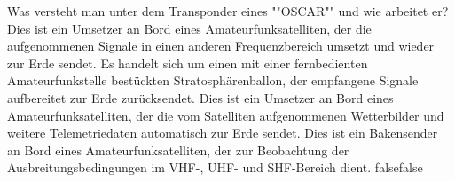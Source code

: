     {Was versteht man unter dem Transponder eines ""OSCAR"" und wie arbeitet er?}
    {Dies ist ein Umsetzer an Bord eines Amateurfunksatelliten, der die aufgenommenen Signale in einen anderen Frequenzbereich umsetzt und wieder zur Erde sendet.}
    {Es handelt sich um einen mit einer fernbedienten Amateurfunkstelle bestückten Stratosphärenballon, der empfangene Signale aufbereitet zur Erde zurücksendet.}
    {Dies ist ein Umsetzer an Bord eines Amateurfunksatelliten, der die vom Satelliten aufgenommenen Wetterbilder und weitere Telemetriedaten automatisch zur Erde sendet.}
    {Dies ist ein Bakensender an Bord eines Amateurfunksatelliten, der zur Beobachtung der Ausbreitungsbedingungen im VHF-, UHF- und SHF-Bereich dient.}
    {false}{false}